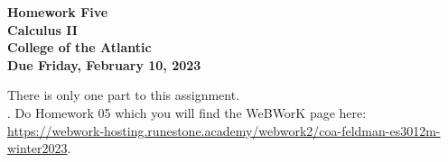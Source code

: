 \documentclass[12pt]{article}
\begin{document}
\pagestyle{empty}
 
\begin{center}
{\LARGE {\bf Homework Five}}\\
\bigskip
{\Large {\bf Calculus II}}\\
\bigskip
{\Large {\bf College of the Atlantic}}\\
\bigskip
{ {\bf Due Friday, February 10, 2023}}\\ 
\end{center}
\medskip


\noindent There is only one part to this assignment.\\

.  Do Homework 05 which you
will find the WeBWorK page here:
\url{https://webwork-hosting.runestone.academy/webwork2/coa-feldman-es3012m-winter2023}.





\end{document}
